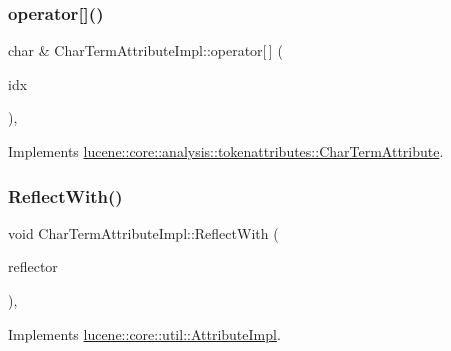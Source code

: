 \subsubsection{\texorpdfstring{operator[]()}{operator[]()}}
{\footnotesize\ttfamily char \& Char\+Term\+Attribute\+Impl\+::operator\mbox{[}$\,$\mbox{]} (\begin{DoxyParamCaption}\item[{\mbox{\hyperlink{ZlibCrc32_8h_a2c212835823e3c54a8ab6d95c652660e}{const}} uint32\+\_\+t}]{idx }\end{DoxyParamCaption})\hspace{0.3cm}{\ttfamily [override]}, {\ttfamily [virtual]}}



Implements \mbox{\hyperlink{classlucene_1_1core_1_1analysis_1_1tokenattributes_1_1CharTermAttribute_af6a554c50515313093c1ac61c3bddbe7}{lucene\+::core\+::analysis\+::tokenattributes\+::\+Char\+Term\+Attribute}}.

\mbox{\label{classlucene_1_1core_1_1analysis_1_1tokenattributes_1_1CharTermAttributeImpl_ae434068c40b8eab62af50e0e33a71bf4}} 
\subsubsection{\texorpdfstring{Reflect\+With()}{ReflectWith()}}
{\footnotesize\ttfamily void Char\+Term\+Attribute\+Impl\+::\+Reflect\+With (\begin{DoxyParamCaption}\item[{\mbox{\hyperlink{namespacelucene_1_1core_1_1util_a7dbb701adaed055f73fb95eec83da10a}{lucene\+::core\+::util\+::\+Attribute\+Reflector}} \&}]{reflector }\end{DoxyParamCaption})\hspace{0.3cm}{\ttfamily [override]}, {\ttfamily [virtual]}}



Implements \mbox{\hyperlink{classlucene_1_1core_1_1util_1_1AttributeImpl_a84d34275fb1ed67ac36fad7ff6388096}{lucene\+::core\+::util\+::\+Attribute\+Impl}}.

